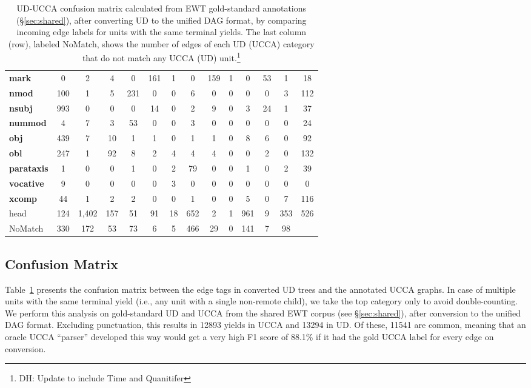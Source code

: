 \documentclass[11pt,a4paper]{article}
\newcommand{\daniel}[1]{\footnote{\color{blue}DH: #1}}
\begin{document}
\begin{table}[t]
\begin{tabular}{l|cccccccccccc|c}
\bf mark & 0 & 2 & 4 & 0 & 161 & 1 & 0 & 159 & 1 & 0 & 53 & 1 & 18 \\
\bf nmod & 100 & 1 & 5 & 231 & 0 & 0 & 6 & 0 & 0 & 0 & 0 & 3 & 112 \\
\bf nsubj & 993 & 0 & 0 & 0 & 14 & 0 & 2 & 9 & 0 & 3 & 24 & 1 & 37 \\
\bf nummod & 4 & 7 & 3 & 53 & 0 & 0 & 3 & 0 & 0 & 0 & 0 & 0 & 24 \\
\bf obj & 439 & 7 & 10 & 1 & 1 & 0 & 1 & 1 & 0 & 8 & 6 & 0 & 92 \\
\bf obl & 247 & 1 & 92 & 8 & 2 & 4 & 4 & 4 & 0 & 0 & 2 & 0 & 132 \\
\bf parataxis & 1 & 0 & 0 & 1 & 0 & 2 & 79 & 0 & 0 & 1 & 0 & 2 & 39 \\
\bf vocative & 9 & 0 & 0 & 0 & 0 & 3 & 0 & 0 & 0 & 0 & 0 & 0 & 0 \\
\bf xcomp & 44 & 1 & 2 & 2 & 0 & 0 & 1 & 0 & 0 & 5 & 0 & 7 & 116 \\
\hline
head & 124 & 1,402 & 157 & 51 & 91 & 18 & 652 & 2 & 1 & 961 & 9 & 353 & 526 \\
{\sc NoMatch} & 330 & 172 & 53 & 73 & 6 & 5 & 466 & 29 & 0 & 141 & 7 & 98
\end{tabular}
\caption{UD-UCCA confusion matrix calculated from EWT
gold-standard annotations (\S\ref{sec:shared}),
after converting UD to the unified DAG format,
by comparing incoming edge labels for units with the same terminal yields.
The last column (row), labeled {\sc NoMatch}, shows the number of edges of each UD (UCCA) category
that do not match any UCCA (UD) unit.\daniel{Update to include Time and Quanitifer}
\label{tab:confusion_matrix}}
\end{table}

\subsection{Confusion Matrix}\label{sec:confusion}

Table~\ref{tab:confusion_matrix} presents the confusion matrix between the edge tags in converted UD trees
and the annotated UCCA graphs.
In case of multiple units with the same terminal yield (i.e., any unit with a single non-remote child),
we take the top category only to avoid double-counting.
We perform this analysis on gold-standard UD and UCCA from the shared EWT corpus
(see \S\ref{sec:shared}),
after conversion to the unified DAG format.
Excluding punctuation, this results in 12893 yields in UCCA and
13294 in UD.
Of these, 11541 are common, meaning that an oracle UCCA ``parser'' developed this way
would get a very high F1 score
of 88.1\% if it had the gold UCCA label for every edge on conversion.
\end{document}
